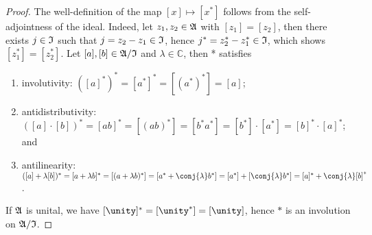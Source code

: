 \begin{proof}
    The well-definition of the map \([x] \mapsto [x^*]\) follows from the self-adjointness of the ideal. Indeed, let \(z_1, z_2 \in \mathfrak{A}\) with \([z_1] = [z_2]\), then there exists \(j \in \mathfrak{I}\) such that \(j = z_2 - z_1 \in \mathfrak{I}\), hence \(j^* = z_2^* - z_1^* \in \mathfrak{I}\), which shows \([z_1^*] = [z_2^*]\). Let \([a], [b] \in \mathfrak{A}/\mathfrak{I}\) and \(\lambda\in \mathbb{C}\), then * satisfies
    \begin{enumerate}[label=(\alph*)]
        \item involutivity: \(\left([a]^*\right)^* = [a^*]^* = [(a^*)^*] = [a]\);
        \item antidistributivity: \(([a]\cdot[b])^* = [ab]^* = [(ab)^*] = [b^*a^*] = [b^*]\cdot[a^*] = [b]^* \cdot [a]^*\); and
        \item antilinearity: \(([a] + \lambda[b])^* = [a + \lambda b]^* = [(a + \lambda b)^*] = [a^* + \conj{\lambda}b^*] = [a^*] + [\conj{\lambda} b^*] = [a]^* + \conj{\lambda}[b]^*\).
    \end{enumerate}
    If \(\mathfrak{A}\) is unital, we have \([\unity]^* = [\unity^*] = [\unity]\), hence \(*\) is an involution on \(\mathfrak{A}/\mathfrak{I}\).
\end{proof}

